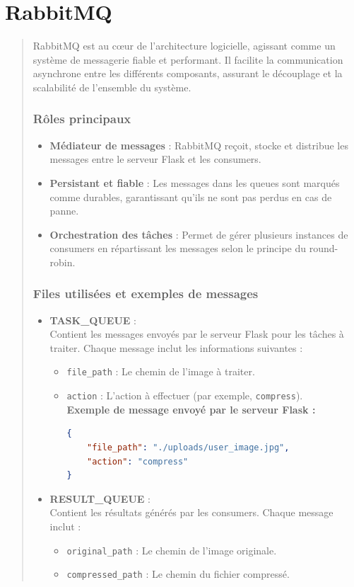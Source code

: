 \documentclass[12pt]{article}
\begin{document}
\section{RabbitMQ}
\begin{quote}
RabbitMQ est au cœur de l'architecture logicielle, agissant comme un système de messagerie fiable et performant. Il facilite la communication asynchrone entre les différents composants, assurant le découplage et la scalabilité de l'ensemble du système.

\subsubsection*{Rôles principaux}
\begin{itemize}
    \item \textbf{Médiateur de messages} : RabbitMQ reçoit, stocke et distribue les messages entre le serveur Flask et les consumers.
    \item \textbf{Persistant et fiable} : Les messages dans les queues sont marqués comme durables, garantissant qu'ils ne sont pas perdus en cas de panne.
    \item \textbf{Orchestration des tâches} : Permet de gérer plusieurs instances de consumers en répartissant les messages selon le principe du round-robin.
\end{itemize}

\subsubsection*{Files utilisées et exemples de messages}
\begin{itemize}
    \item \textbf{TASK\_QUEUE} : \\
    Contient les messages envoyés par le serveur Flask pour les tâches à traiter. Chaque message inclut les informations suivantes :
    \begin{itemize}
        \item \texttt{file\_path} : Le chemin de l'image à traiter.
        \item \texttt{action} : L'action à effectuer (par exemple, \texttt{compress}).\\

        \textbf{Exemple de message envoyé par le serveur Flask :} 
        \begin{lstlisting}[language=json]
{
    "file_path": "./uploads/user_image.jpg",
    "action": "compress"
}
        \end{lstlisting}
    \end{itemize}
    \vspace{6mm}
    \item \textbf{RESULT\_QUEUE} : \\
    Contient les résultats générés par les consumers. Chaque message inclut :
    \begin{itemize}
        \item \texttt{original\_path} : Le chemin de l'image originale.
        \item \texttt{compressed\_path} : Le chemin du fichier compressé. \\


\end{itemize}
\end{itemize}
\end{quote}
\end{document}
